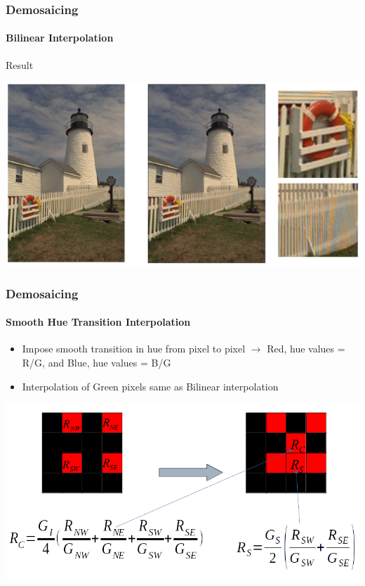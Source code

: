 \documentclass{beamer}
\begin{document}
\begin{frame}
\frametitle{Demosaicing}
\framesubtitle{Bilinear Interpolation}
\begin{block}{Result}
\begin{center}
\includegraphics[scale=0.35]{images/L7_res_BI.png}
\end{center}
\end{block}
\end{frame}
\begin{frame}
\frametitle{Demosaicing}
\framesubtitle{Smooth Hue Transition Interpolation}
\begin{itemize}
\item Impose smooth transition in hue from pixel to pixel $\rightarrow$ {\color{red}Red, hue values} = {\color{red}R}/{\color{green}G}, and 
{\color{blue}Blue, hue values} = {\color{blue}B}/{\color{green}G}
\item Interpolation of {\color{green} Green} pixels same as Bilinear interpolation 
\end{itemize}
\begin{center}
\includegraphics[scale=0.3]{images/L7_SmoothedCI.png}
\end{center}
\end{frame}
\end{document}
